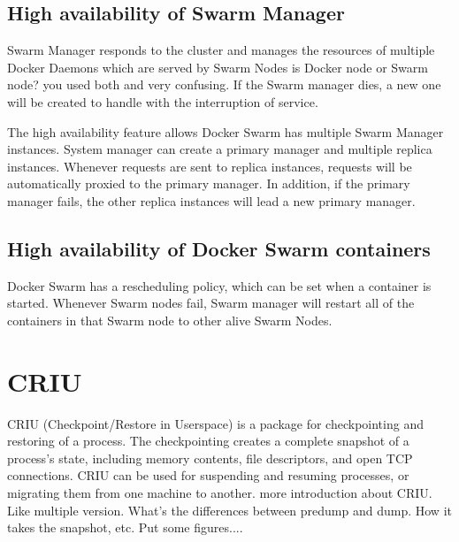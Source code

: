 \subsection{High availability of Swarm Manager}
Swarm Manager responds to the cluster and manages the resources of multiple Docker Daemons which are served by Swarm Nodes {\color{red} is Docker node or Swarm node? you used both and very confusing}. If the Swarm manager dies, a new one will be created to handle with the interruption of service.

The high availability feature allows Docker Swarm has multiple Swarm Manager instances. System manager can create a primary manager and multiple replica instances.
Whenever requests are sent to replica instances, requests will be automatically proxied to the primary manager.
In addition, if the primary manager fails, the other replica instances will lead a new primary manager.

\subsection{High availability of Docker Swarm containers}
Docker Swarm has a rescheduling policy, which can be set when a container is started.  Whenever Swarm nodes fail, Swarm manager will restart all of the containers in that Swarm node to other alive Swarm Nodes.

\section{CRIU}
CRIU \cite{CRIU} (Checkpoint/Restore in Userspace) is a package for checkpointing and restoring of a process.  The checkpointing creates a complete snapshot of a process's state, including  memory contents, file descriptors, and open TCP connections.  CRIU can be used for suspending and resuming processes, or migrating them from one machine to another.
{\color{red} more introduction about CRIU.  Like multiple version.  What's the differences between predump and dump. How it takes the snapshot, etc.  Put some figures....}

